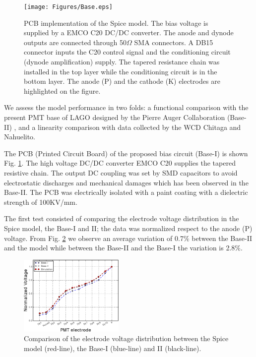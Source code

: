 \documentclass[letterpaper, 10 pt, conference]{ieeeconf}  %
\begin{document}
\begin{figure}[h!]
\begin{center}
\texttt{[image: Figures/Base.eps]}
\caption{PCB implementation of the Spice model. The bias voltage is supplied by a EMCO C20 DC/DC converter. The anode and dynode outputs are connected through 50$\Omega$ SMA connectors. A DB15 connector inputs the C20 control signal and the conditioning circuit (dynode amplification) supply. The tapered resistance chain was installed in the top layer while the conditioning circuit is in the bottom layer. The anode (P) and the cathode (K) electrodes are highlighted on the figure.}
\label{Base}
\end{center}
\end{figure}

We assess the model performance in two folds: a functional comparison with the present PMT base of LAGO designed by the Pierre Auger Collaboration (Base-II) \cite{Genolini2001}, and a linearity comparison with data collected by the WCD Chitaga and Nahuelito. 

The PCB (Printed Circuit Board) of the proposed bias circuit (Base-I) is shown Fig. \ref{Base}. The high voltage DC/DC converter EMCO C20 supplies the tapered resistive chain. The output DC coupling was set by SMD capacitors to avoid electrostatic discharges and mechanical damages which has been observed in the Base-II. The PCB was electrically isolated with a paint coating with a dielectric strength of 100KV/mm.

The first test consisted of comparing the electrode voltage distribution in the Spice model, the Base-I and II; the data was normalized respect to the anode (P) voltage. From Fig. \ref{Comparison} we observe an average variation of 0.7$\%$ between the Base-II and the model while between the Base-II and the Base-I the variation is 2.8$\%$.

\begin{figure}[h!]
\begin{center}
\includegraphics[width=0.45\textwidth]{Figures/LAGO_Auger.eps}
\caption{Comparison of the electrode voltage distribution between the Spice model (red-line), the Base-I (blue-line) and II (black-line).}
\label{Comparison}
\end{center}
\end{figure}
\end{document}
